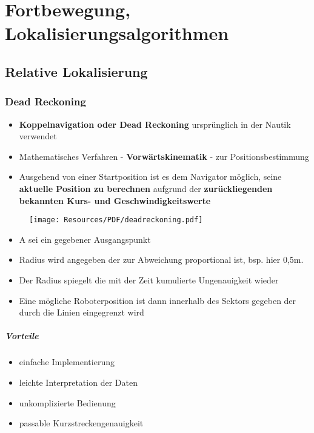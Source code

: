 \chapter{Fortbewegung, Lokalisierungsalgorithmen}
\section{Relative Lokalisierung}
\subsection{Dead Reckoning}
\begin{itemize}
	\item \textbf{Koppelnavigation oder Dead Reckoning} ursprünglich in der Nautik verwendet
	\item Mathematisches Verfahren - \textbf{Vorwärtskinematik} - zur Positionsbestimmung
	\item Ausgehend von einer Startposition ist es dem Navigator möglich, seine \textbf{aktuelle Position zu berechnen} aufgrund der \textbf{zurückliegenden bekannten Kurs- und Geschwindigkeitswerte}
\end{itemize}
\begin{figure}[H]
	\begin{center}
		\texttt{[image: Resources/PDF/deadreckoning.pdf]}
		\caption{}
		\label{fig:PDF/deadreckoning.pdf}
	\end{center}
\end{figure}
\begin{itemize}
	\item A sei ein gegebener Ausgangspunkt
	\item Radius wird angegeben der zur Abweichung proportional ist, bsp. hier 0,5m.
	\item Der Radius spiegelt die mit der Zeit kumulierte Ungenauigkeit wieder
	\item Eine mögliche Roboterposition ist dann innerhalb des Sektors gegeben der durch die Linien eingegrenzt wird
\end{itemize}
\paragraph{Vorteile}
\begin{itemize}
	\item einfache Implementierung
	\item leichte Interpretation der Daten
	\item unkomplizierte Bedienung
	\item passable Kurzstreckengenauigkeit
\end{itemize}
